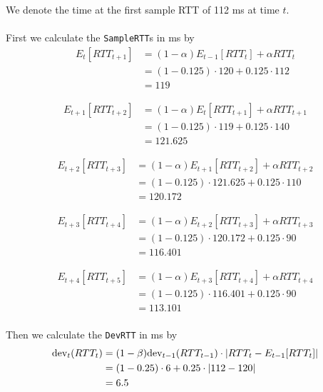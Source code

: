 We denote the time at the first sample RTT of 112 ms at time $t$. \\
\\
First we calculate the \texttt{SampleRTT}s in ms by 
\begin{equation*}
\begin{split}
    E_t[RTT_{t+1}] &= (1 - \alpha) E_{t-1}[RTT_t] + \alpha RTT_t \\
    &= (1 - 0.125) \cdot 120 + 0.125 \cdot 112 \\
    &= 119
\end{split}
\end{equation*}

\begin{equation*}
\begin{split}
    E_{t+1}[RTT_{t+2}] &= (1 - \alpha) E_t[RTT_{t+1}] + \alpha RTT_{t+1} \\
    &= (1 - 0.125) \cdot 119 + 0.125 \cdot 140 \\
    &= 121.625
\end{split}
\end{equation*}

\begin{equation*}
    \begin{split}
        E_{t+2}[RTT_{t+3}] &= (1 - \alpha) E_{t+1}[RTT_{t+2}] + \alpha RTT_{t+2} \\
        &= (1 - 0.125) \cdot 121.625 + 0.125 \cdot 110 \\
        &= 120.172
\end{split}
\end{equation*}

\begin{equation*}
    \begin{split}
        E_{t+3}[RTT_{t+4}] &= (1 - \alpha) E_{t+2}[RTT_{t+3}] + \alpha RTT_{t+3} \\
        &= (1 - 0.125) \cdot 120.172 + 0.125 \cdot 90 \\
        &= 116.401
\end{split}
\end{equation*}

\begin{equation*}
    \begin{split}
        E_{t+4}[RTT_{t+5}] &= (1 - \alpha) E_{t+3}[RTT_{t+4}] + \alpha RTT_{t+4} \\
        &= (1 - 0.125) \cdot 116.401 + 0.125 \cdot 90 \\
        &= 113.101
\end{split}
\end{equation*}
\\
Then we calculate the \texttt{DevRTT} in ms by
\begin{equation*}
    \begin{split}
        \text{dev}_t(RTT_t) &= (1 - \beta) \text{dev}_{t-1}(RTT_{t-1}) \cdot \left |RTT_t - E_{t-1}[RTT_t]\right| \\
        &=  (1 - 0.25) \cdot 6 + 0.25 \cdot \left |112 - 120\right| \\
        &= 6.5
\end{split}
\end{equation*}

